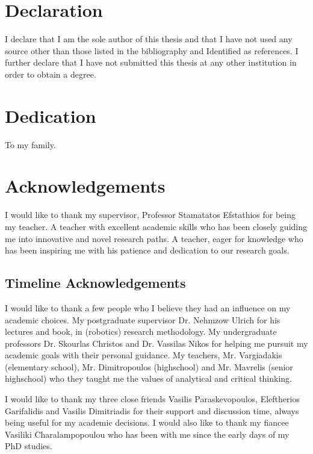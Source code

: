 \documentclass[
    12pt, %
    singlespacing, %
    headsepline, %
]{DoctoralThesis} %
\begin{document}
\section*{Declaration}
I declare that I am the sole author of this thesis and that I have not used any source other than those listed in the bibliography and Identified as references. I further declare that I have not submitted this thesis at any other institution in order to obtain a degree.

\newpage


\section*{Dedication}
To my family.

\newpage
 

\section*{Acknowledgements}
I would like to thank my supervisor, Professor Stamatatos Efstathios for being my teacher. A teacher with excellent academic skills who has been closely guiding me into innovative and novel research paths. A teacher, eager for knowledge who has been inspiring me with his patience and dedication to our research goals. 

\subsection*{Timeline Acknowledgements}
I would like to thank a few people who I believe they had an influence on my academic choices. My postgraduate supervisor Dr. Nehmzow Ulrich for his lectures and book, in (robotics) research methodology. My undergraduate professors Dr. Skourlas Christos and Dr. Vassilas Nikos for helping me pursuit my academic goals with their personal guidance. My teachers, Mr. Vargiadakis (elementary school), Mr. Dimitropoulos (highschool) and Mr. Mavrelis (senior highschool) who they taught me the values of analytical and critical thinking. 

I would like to thank my three close friends Vasilis Paraskevopoulos, Eleftherios Garifalidis and Vasilis Dimitriadis for their support and discussion time, always being useful for my academic decisions. I would also like to thank my fiancee Vasiliki Charalampopoulou who has been with me since the early days of my PhD studies.
\end{document}
